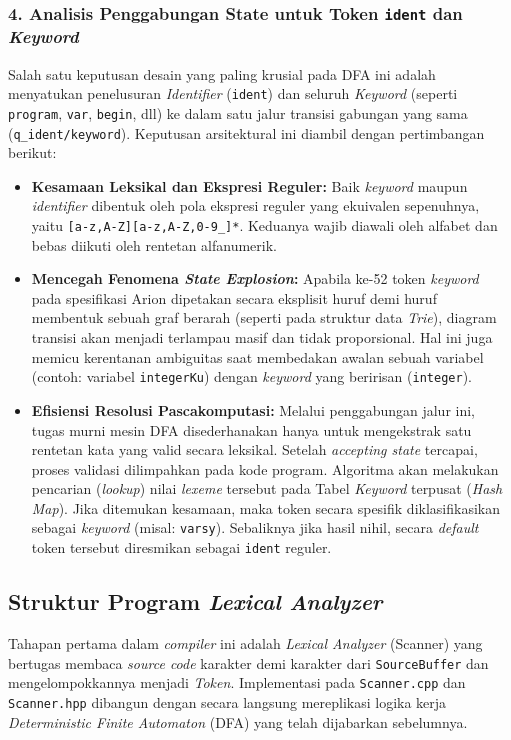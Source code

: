 \documentclass[12pt,a4paper]{article}
\begin{document}
\subsubsection*{4. Analisis Penggabungan State untuk Token \texttt{ident} dan \textit{Keyword}}
Salah satu keputusan desain yang paling krusial pada DFA ini adalah menyatukan penelusuran \textit{Identifier} (\texttt{ident}) dan seluruh \textit{Keyword} (seperti \texttt{program}, \texttt{var}, \texttt{begin}, dll) ke dalam satu jalur transisi gabungan yang sama (\texttt{q\_ident/keyword}). Keputusan arsitektural ini diambil dengan pertimbangan berikut:
\begin{itemize}
    \item \textbf{Kesamaan Leksikal dan Ekspresi Reguler:} Baik \textit{keyword} maupun \textit{identifier} dibentuk oleh pola ekspresi reguler yang ekuivalen sepenuhnya, yaitu \texttt{[a-z,A-Z][a-z,A-Z,0-9\_]*}. Keduanya wajib diawali oleh alfabet dan bebas diikuti oleh rentetan alfanumerik.
    \item \textbf{Mencegah Fenomena \textit{State Explosion}:} Apabila ke-52 token \textit{keyword} pada spesifikasi Arion dipetakan secara eksplisit huruf demi huruf membentuk sebuah graf berarah (seperti pada struktur data \textit{Trie}), diagram transisi akan menjadi terlampau masif dan tidak proporsional. Hal ini juga memicu kerentanan ambiguitas saat membedakan awalan sebuah variabel (contoh: variabel \texttt{integerKu}) dengan \textit{keyword} yang beririsan (\texttt{integer}).
    \item \textbf{Efisiensi Resolusi Pascakomputasi:} Melalui penggabungan jalur ini, tugas murni mesin DFA disederhanakan hanya untuk mengekstrak satu rentetan kata yang valid secara leksikal. Setelah \textit{accepting state} tercapai, proses validasi dilimpahkan pada kode program. Algoritma akan melakukan pencarian (\textit{lookup}) nilai \textit{lexeme} tersebut pada Tabel \textit{Keyword} terpusat (\textit{Hash Map}). Jika ditemukan kesamaan, maka token secara spesifik diklasifikasikan sebagai \textit{keyword} (misal: \texttt{varsy}). Sebaliknya jika hasil nihil, secara \textit{default} token tersebut diresmikan sebagai \texttt{ident} reguler.
\end{itemize}

\subsection{Struktur Program \textit{Lexical Analyzer}}

Tahapan pertama dalam \textit{compiler} ini adalah \textit{Lexical Analyzer} (Scanner) yang bertugas membaca \textit{source code} karakter demi karakter dari \texttt{SourceBuffer} dan mengelompokkannya menjadi \textit{Token}. Implementasi pada \texttt{Scanner.cpp} dan \texttt{Scanner.hpp} dibangun dengan secara langsung mereplikasi logika kerja \textit{Deterministic Finite Automaton} (DFA) yang telah dijabarkan sebelumnya.
\end{document}
